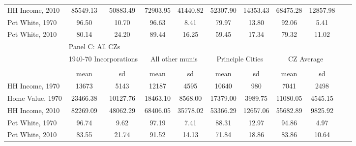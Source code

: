 \begin{tabular}{l*{10}{c}}
HH Income, 2010     &    85549.13&    50883.49&    72903.95&    41440.82&    52307.90&    14353.43&    68475.28&    12857.98\\
Pct White, 1970     &       96.50&       10.70&       96.63&        8.41&       79.97&       13.80&       92.06&        5.41\\
Pct White, 2010     &       80.14&       24.20&       89.44&       16.25&       59.45&       17.34&       79.32&       11.02\\
\toprule
&\multicolumn{8}{l}{Panel C: All CZs}\\
\cmidrule(lr){1-9}
&\multicolumn{2}{c}{1940-70 Incorporations}&\multicolumn{2}{c}{All other munis}&\multicolumn{2}{c}{Principle Cities}&\multicolumn{2}{c}{CZ Average}\\ \cmidrule(lr){2-3}  \cmidrule(lr){4-5} \cmidrule(lr){6-7} \cmidrule(lr){8-9}
                    &\multicolumn{2}{c}{}     &\multicolumn{2}{c}{}     &\multicolumn{2}{c}{}     &\multicolumn{2}{c}{}     \\
                    &        mean&          sd&        mean&          sd&        mean&          sd&        mean&          sd\\
\midrule
HH Income, 1970     &       13673&        5143&       12187&        4595&       10640&         980&        7041&        2498\\
Home Value, 1970    &    23466.38&    10127.76&    18463.10&     8568.00&    17379.00&     3989.75&    11080.05&     4545.15\\
HH Income, 2010     &    82269.09&    48062.29&    68406.05&    35778.02&    53366.29&    12657.06&    55682.89&     9825.92\\
Pct White, 1970     &       96.74&        9.62&       97.19&        7.41&       88.31&       12.97&       94.86&        4.97\\
Pct White, 2010     &       83.55&       21.74&       91.52&       14.13&       71.84&       18.86&       83.86&       10.64\\
\midrule \bottomrule \end{tabular}
